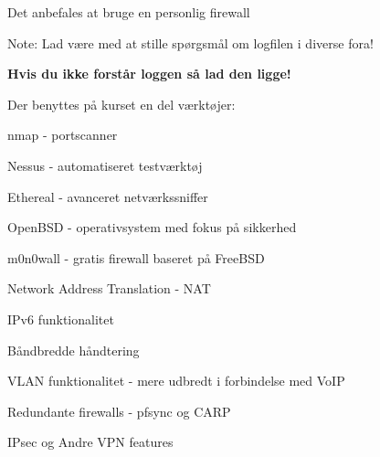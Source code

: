 \centerline{\color{titlecolor}Det anbefales at bruge en personlig firewall}

Note: Lad være med at stille spørgsmål om logfilen i diverse fora!

{\bfseries Hvis du ikke forstår loggen så lad den ligge!}





\begin{list1}
\item Der benyttes på kurset en del værktøjer:
\begin{list2}
\item nmap -  portscanner
\item Nessus -  automatiseret testværktøj
\item Ethereal -  avanceret netværkssniffer
\item OpenBSD -  operativsystem med fokus
  på sikkerhed 
\item m0n0wall -  gratis firewall baseret på FreeBSD

\end{list2}
\end{list1}


\begin{list2}
\item Network Address Translation - NAT
\item IPv6 funktionalitet

\item Båndbredde håndtering
\item VLAN funktionalitet - mere udbredt i forbindelse med VoIP
\item Redundante firewalls - pfsync og CARP
\item IPsec og Andre VPN features
\end{list2}

